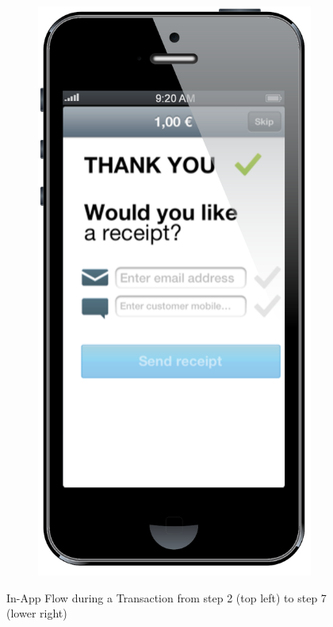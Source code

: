 \documentclass[a4paper, oneside]{csthesis}
\begin{document}
\begin{figure}
\begin{subfigure}[b]{0.22\textwidth}
                \includegraphics[width=\textwidth]{figures/flow6.png}
                \label{fig:flow6}
        \end{subfigure}
        \caption{In-App Flow during a Transaction from step 2 (top left) to step 7 (lower right)}\label{fig:flow-customer}
\end{figure}
\end{document}
